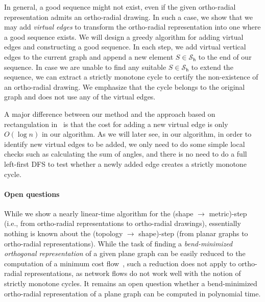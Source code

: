 \documentclass{article}\usepackage[a4paper,margin=20mm]{geometry}
\newcommand{\PH}{\mathcal{S}_\mathsf{h}}
\begin{document}
In general, a good sequence might not exist, even if the given ortho-radial representation admits an ortho-radial drawing. In such a case, we show that we may add \emph{virtual edges} to transform the ortho-radial representation into one where a good sequence exists. 
We will design a greedy algorithm for adding virtual edges and constructing a good sequence. In each step, we add virtual vertical edges to the current graph and append a new element $S \in \PH$ to the end of our sequence. In case we are unable to find any suitable $S \in \PH$ to extend the sequence, we can extract a strictly monotone cycle to certify the non-existence of an ortho-radial drawing. We emphasize that the cycle belongs to the original graph and does not use any of the virtual edges.

A major difference between our method and the approach based on rectangulation in~\cite{barth2023topology} is that the cost for adding a new virtual edge is only $O(\log n)$ in our algorithm. As we will later see, in our algorithm, in order to identify new virtual edges to be added, we only need to do some simple local checks such as calculating the sum of angles, and there is no need to do a full left-first DFS to test whether a newly added edge creates a strictly monotone cycle. 

\paragraph{Open questions} While we show a nearly linear-time algorithm for the (shape $\rightarrow$ metric)-step (i.e., from ortho-radial representations to ortho-radial drawings), essentially nothing is known about the (topology $\rightarrow$ shape)-step (from planar graphs to ortho-radial representations). 
While the task of finding a \emph{bend-minimized orthogonal representation} of a given plane graph can be easily reduced to the computation of a minimum cost flow~\cite{tamassia1987embedding}, such a reduction does not apply to ortho-radial representations, as network flows do not work well with the notion of strictly monotone cycles. It remains an open question whether a bend-minimized ortho-radial representation of a plane graph can be computed in polynomial time.
 
 
\end{document}

